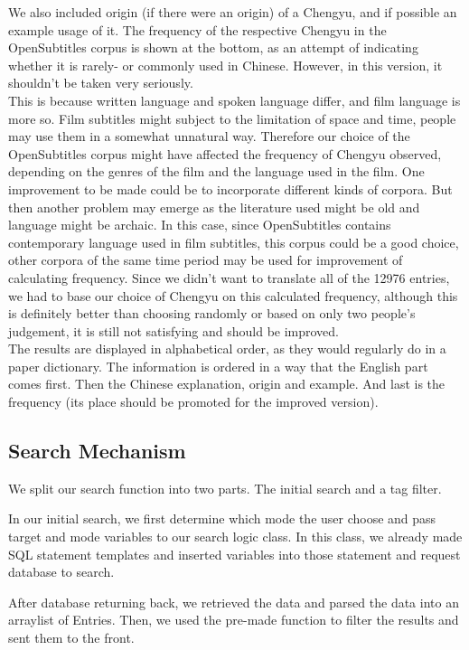 \documentclass[11pt]{article} %
\begin{document}
We also included origin (if there were an origin) of a Chengyu, and if possible an example usage of it. The frequency of the respective Chengyu in the OpenSubtitles corpus is shown at the bottom, as an attempt of indicating whether it is rarely- or commonly used in Chinese. However, in this version, it shouldn't be taken very seriously. \\
\indent This is because written language and spoken language differ, and film language is more so. Film subtitles might subject to the limitation of space and time, people may use them in a somewhat unnatural way. Therefore our choice of the OpenSubtitles corpus might have affected the frequency of Chengyu observed, depending on the genres of the film and the language used in the film. One improvement to be made could be to incorporate different kinds of corpora. But then another problem may emerge as the literature used might be old and language might be archaic. In this case, since OpenSubtitles contains contemporary language used in film subtitles, this corpus could be a good choice, other corpora of the same time period may be used for improvement of calculating frequency. Since we didn't want to translate all of the 12976 entries, we had to base our choice of Chengyu on this calculated frequency, although this is definitely better than choosing randomly or based on only two people's judgement, it is still not satisfying and should be improved.\\
\indent The results are displayed in alphabetical order, as they would regularly do in a paper dictionary. The information is ordered in a way that the English part comes first. Then the Chinese explanation, origin and example. And last is the frequency (its place should be promoted for the improved version).

\subsection{Search Mechanism}

\indent We split our search function into two parts. The initial search and a tag filter.

In our initial search, we first determine which mode the user choose and pass target and mode variables to our search logic class. In this class, we already made SQL statement templates and inserted variables into those statement and request database to search.

After database returning back, we retrieved the data and parsed the data into an arraylist of Entries. Then, we used the pre-made function to filter the results and sent them to the front.
\end{document}
